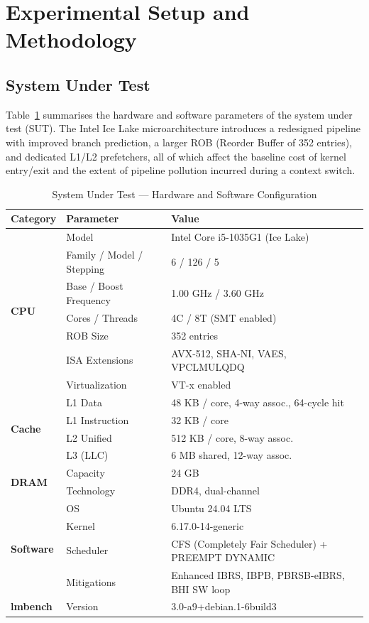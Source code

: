 \documentclass[12pt,a4paper]{article}
\begin{document}
\section{Experimental Setup and Methodology}
\label{sec:setup}

\subsection{System Under Test}

Table~\ref{tab:sysinfo} summarises the hardware and software parameters of the
system under test (SUT). The Intel Ice Lake microarchitecture introduces a
redesigned pipeline with improved branch prediction, a larger ROB (Reorder
Buffer of 352 entries), and dedicated L1/L2 prefetchers, all of which affect
the baseline cost of kernel entry/exit and the extent of pipeline pollution
incurred during a context switch.

\begin{table}[H]
\centering
\caption{System Under Test — Hardware and Software Configuration}
\label{tab:sysinfo}
\begin{tabular}{lll}
\toprule
\rowcolor{tablehead!20}
\textbf{Category} & \textbf{Parameter} & \textbf{Value} \\
\midrule
\multirow{7}{*}{\textbf{CPU}} &
  Model & Intel Core i5-1035G1 (Ice Lake) \\
& Family / Model / Stepping & 6 / 126 / 5 \\
& Base / Boost Frequency & 1.00 GHz / 3.60 GHz \\
& Cores / Threads & 4C / 8T (SMT enabled) \\
& ROB Size & 352 entries \\
& ISA Extensions & AVX-512, SHA-NI, VAES, VPCLMULQDQ \\
& Virtualization & VT-x enabled \\
\midrule
\multirow{4}{*}{\textbf{Cache}} &
  L1 Data & 48 KB / core, 4-way assoc., 64-cycle hit \\
& L1 Instruction & 32 KB / core \\
& L2 Unified & 512 KB / core, 8-way assoc. \\
& L3 (LLC) & 6 MB shared, 12-way assoc. \\
\midrule
\multirow{2}{*}{\textbf{DRAM}} &
  Capacity & 24 GB \\
& Technology & DDR4, dual-channel \\
\midrule
\multirow{4}{*}{\textbf{Software}} &
  OS & Ubuntu 24.04 LTS \\
& Kernel & 6.17.0-14-generic \\
& Scheduler & CFS (Completely Fair Scheduler) + PREEMPT DYNAMIC \\
& Mitigations & Enhanced IBRS, IBPB, PBRSB-eIBRS, BHI SW loop \\
\midrule
\textbf{lmbench} & Version & 3.0-a9+debian.1-6build3 \\
\bottomrule
\end{tabular}
\end{table}
\end{document}
